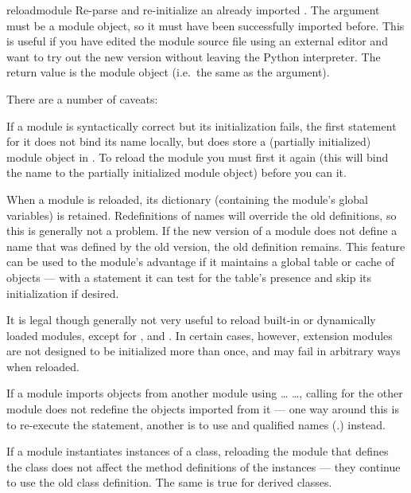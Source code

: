 \begin{funcdesc}{reload}{module}
Re-parse and re-initialize an already imported .  The
argument must be a module object, so it must have been successfully
imported before.  This is useful if you have edited the module source
file using an external editor and want to try out the new version
without leaving the Python interpreter.  The return value is the
module object (i.e.\ the same as the  argument).

There are a number of caveats:

If a module is syntactically correct but its initialization fails, the
first  statement for it does not bind its name locally,
but does store a (partially initialized) module object in
.  To reload the module you must first
 it again (this will bind the name to the partially
initialized module object) before you can  it.

When a module is reloaded, its dictionary (containing the module's
global variables) is retained.  Redefinitions of names will override
the old definitions, so this is generally not a problem.  If the new
version of a module does not define a name that was defined by the old
version, the old definition remains.  This feature can be used to the
module's advantage if it maintains a global table or cache of objects
--- with a  statement it can test for the table's presence
and skip its initialization if desired.

It is legal though generally not very useful to reload built-in or
dynamically loaded modules, except for , 
and .  In certain cases, however, extension
modules are not designed to be initialized more than once, and may
fail in arbitrary ways when reloaded.

If a module imports objects from another module using 
\ldots{}  \ldots{}, calling  for
the other module does not redefine the objects imported from it ---
one way around this is to re-execute the  statement,
another is to use  and qualified names
(.) instead.

If a module instantiates instances of a class, reloading the module
that defines the class does not affect the method definitions of the
instances --- they continue to use the old class definition.  The same
is true for derived classes.
\end{funcdesc}

